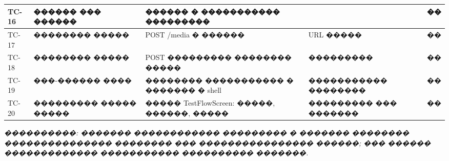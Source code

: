 \begin{table}[H]
{\begin{tabularx}{\textwidth}{|>{\centering\arraybackslash}p{10mm}|>{\RaggedRight\arraybackslash}p{38mm}|>{\RaggedRight\arraybackslash}X|>{\RaggedRight\arraybackslash}p{28mm}|>{\centering\arraybackslash}p{18mm}|}
\hline
TC-16 & ������ ��� ������ & ������ � ����������� ��������� & 401 & �� \\
\hline
TC-17 & �������� ����� & POST /media � ������ & URL ����� & �� \\
\hline
TC-18 & �������� ����� & POST ��������� �������� ����� & ��������� & �� \\
\hline
TC-19 & ���-������ ���� & �������� ����������� � ������� � shell & ����������� �������� & �� \\
\hline
TC-20 & ��������� ����� ����� & ����� TestFlowScreen: �����, ������, ����� & ��������� ��� ������� & �� \\
\hline
\end{tabularx}
}
\end{table}

\noindent\textit{����������: ������� ������������ ��������� � ������� �������� ��������������� �������� ��� ���������������� ������; ��� ������ ������������� ����������� ���������� �������.}
